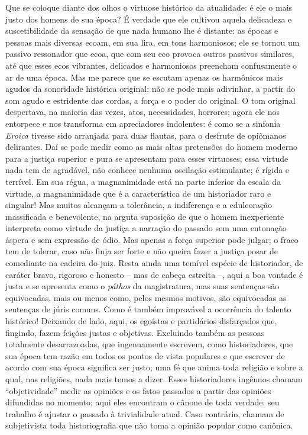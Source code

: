 Que se coloque diante dos olhos o virtuose histórico da atualidade: é
ele o mais justo dos homens de sua época? É verdade que ele cultivou
aquela delicadeza e suscetibilidade da sensação de que nada humano lhe é
distante: as épocas e pessoas mais diversas ecoam, em sua lira, em tons
harmoniosos; ele se tornou um passivo ressonador que ecoa, que com seu
eco provoca outros passivos similares, até que esses ecos vibrantes,
delicados e harmoniosos preencham confusamente o ar de uma época. Mas me
parece que se escutam apenas os harmônicos mais agudos da sonoridade
histórica original: não se pode mais adivinhar, a partir do som agudo e
estridente das cordas, a força e o poder do original. O tom original
despertava, na maioria das vezes, atos, necessidades, horrores; agora
ele nos entorpece e nos transforma em apreciadores indolentes: é como se
a sinfonia \emph{Eroica} tivesse sido arranjada para duas flautas, para
o desfrute de opiômanos delirantes. Daí se pode medir como as mais altas
pretensões do homem moderno para a justiça superior e pura se apresentam
para esses virtuoses; essa virtude nada tem de agradável, não conhece
nenhuma oscilação estimulante; é rígida e terrível. Em sua régua, a
magnanimidade está na parte inferior da escala da virtude, a
magnanimidade que é a característica de um historiador raro e singular!
Mas muitos alcançam a tolerância, a indiferença e a edulcoração
massificada e benevolente, na arguta suposição de que o homem
inexperiente interpreta como virtude da justiça a narração do passado
sem uma entonação áspera e sem expressão de ódio. Mas apenas a força
superior pode julgar; o fraco tem de tolerar, caso não finja ser forte e
não queira fazer a justiça posar de comediante na cadeira do juiz. Resta
ainda uma temível espécie de historiador, de caráter bravo, rigoroso e
honesto -- mas de cabeça estreita --, aqui a boa vontade é justa e se
apresenta como o \emph{páthos} da magistratura, mas suas sentenças são
equivocadas, mais ou menos como, pelos mesmos motivos, são equivocadas
as sentenças de júris comuns. Como é também improvável a ocorrência do
talento histórico! Deixando de lado, aqui, os egoístas e partidários
disfarçados que, fingindo, fazem feições justas e objetivas. Excluindo
também as pessoas totalmente desarrazoadas, que ingenuamente escrevem,
como historiadores, que sua época tem razão em todos os pontos de vista
populares e que escrever de acordo com sua época significa ser justo;
uma fé que anima toda religião e sobre a qual, nas religiões, nada mais
temos a dizer. Esses historiadores ingênuos chamam ``objetividade''
medir as opiniões e os fatos passados a partir das opiniões difundidas
no momento; aqui eles encontram o cânone de toda verdade: seu trabalho é
ajustar o passado à trivialidade atual. Caso contrário, chamam de
subjetivista toda historiografia que não toma a opinião popular como
canônica.

